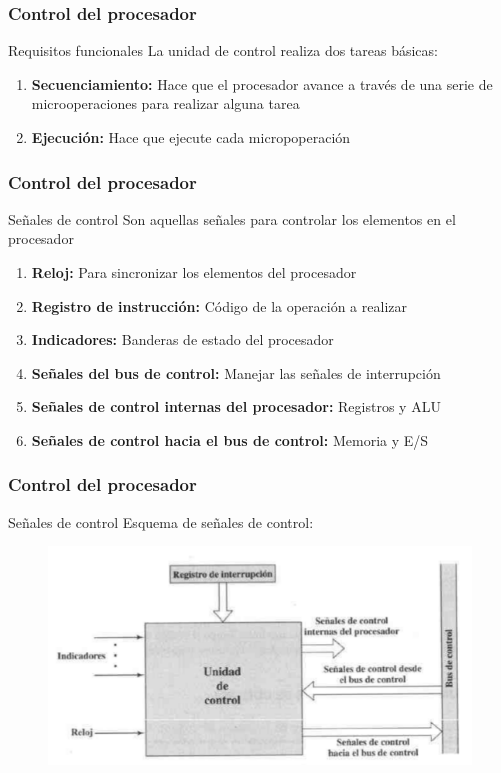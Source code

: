 \documentclass{beamer}
\begin{document}
\begin{frame}
	\frametitle{Control del procesador}
	\begin{block}{Requisitos funcionales}
	La unidad de control realiza dos tareas básicas:
	\begin{enumerate}
		\item \textbf{Secuenciamiento:} Hace que el procesador avance a través de una serie de microoperaciones para realizar alguna tarea
		\item \textbf{Ejecución:} Hace que ejecute cada micropoperación
	\end{enumerate}	 
	\end{block}
\end{frame}

\begin{frame}
	\frametitle{Control del procesador}
	\begin{block}{Señales de control}
	Son aquellas señales para controlar los elementos en el procesador
	\begin{enumerate}
		\item \textbf{Reloj:} Para sincronizar los elementos del procesador
		\item \textbf{Registro de instrucción:} Código de la operación a realizar
		\item \textbf{Indicadores:} Banderas de estado del procesador
		\item \textbf{Señales del bus de control:} Manejar las señales de interrupción
		\item \textbf{Señales de control internas del procesador:} Registros y ALU
		\item \textbf{Señales de control hacia el bus de control:} Memoria y E/S
	\end{enumerate}	 
	\end{block}
\end{frame}

\begin{frame}
	\frametitle{Control del procesador}
	\begin{block}{Señales de control}
	Esquema de señales de control:
	\end{block}		 		
	\begin{figure}[H]
		\centering
		\includegraphics[scale=0.4]{imagenes/control.png} 
	\end{figure}
\end{frame}
\end{document}
